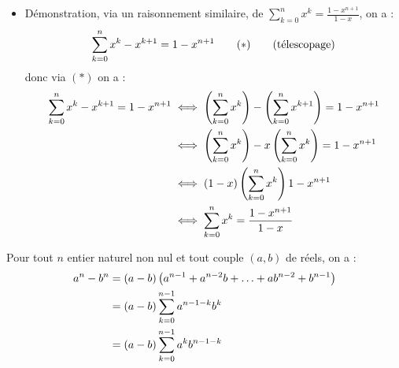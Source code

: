 \begin{dem}
\begin{itemize}
		\item Démonstration, via un raisonnement similaire, de \(\sum_{k=0}^n x^k = \frac{1-x^{n+1}}{1-x}\), on a :
		      \[
			      \sum_{k=0}^n x^k-x^{k+1} =1-x^{n+1} \qquad (*) \qquad \hfill \text{(télescopage)}
		      \]
		      donc via \((*)\) on a :
		      \begin{align*}
			      \sum_{k=0}^n x^k-x^{k+1} =1-x^{n+1} & \iff \left(\sum_{k=0}^n x^k\right) - \left(\sum_{k=0}^n x^{k+1}\right) = 1-x^{n+1} \\
			                                          & \iff \left(\sum_{k=0}^n x^k\right) - x\left(\sum_{k=0}^n x^k\right) = 1 -x^{n+1}   \\
			                                          & \iff \left(1-x\right)\left(\sum_{k=0}^n x^k\right) 1-x^{n+1}                       \\
			                                          & \iff  \sum_{k=0}^n x^k = \frac{1-x^{n+1}}{1-x}                           \\
		      \end{align*}

	\end{itemize}
\end{dem}

\begin{defprop}[Factorisation de \(a^n-b^n\) ]
	Pour tout \(n\) entier naturel non nul et tout couple \((a,b)\) de réels, on a :
	\begin{align*}
		a^n-b^n & = (a-b)\left(a^{n-1} + a^{n-2}b + \ldots + ab^{n-2} + b^{n-1}\right) \\
		        & = (a-b)\sum_{k=0}^{n-1} a^{n-1-k}b^k                            \\
		        & = (a-b)\sum_{k=0}^{n-1} a^kb^{n-1-k}                            \\
	\end{align*}
\end{defprop}

